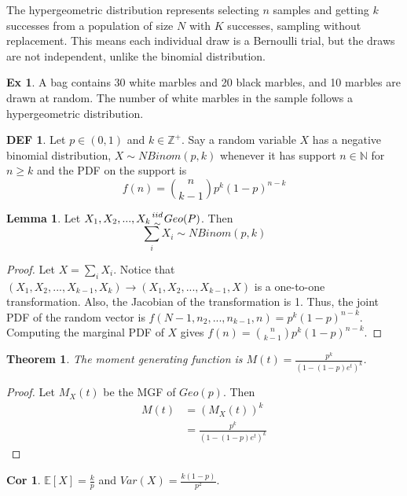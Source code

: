 \documentclass{article}
\newtheorem{theorem}{Theorem}
\theoremstyle{definition}\newtheorem{definition}{DEF}
\theoremstyle{definition}\newtheorem{example}{Ex}
\theoremstyle{lemma}\newtheorem{lemma}{Lemma}
\theoremstyle{corrolary}\newtheorem{corrolary}{Cor}
\begin{document}
The hypergeometric distribution represents selecting $n$ samples and getting $k$ successes from a population of size $N$ with $K$ successes, sampling without replacement.
This means each individual draw is a Bernoulli trial, but the draws are not independent, unlike the binomial distribution.\\

\begin{example}
A bag contains 30 white marbles and 20 black marbles, and 10 marbles are drawn at random.
The number of white marbles in the sample follows a hypergeometric distribution.
\end{example}

\begin{definition}
Let $p\in(0,1)$ and $k\in\mathbb{Z}^+$.
Say a random variable $X$ has a negative binomial distribution, $X\sim NBinom(p,k)$ whenever it has support $n\in \mathbb{N}$ for $n\geq k$ and the PDF on the support is 
\begin{equation}
f(n)=\binom{n}{k-1}p^k(1-p)^{n-k}
\end{equation}
\end{definition}

\begin{lemma}
Let $X_1, X_2, ..., X_k {iid \atop \sim} Geo(P)$.
Then
\begin{equation}
\sum_i X_i \sim NBinom(p,k)
\end{equation}
\end{lemma}
\begin{proof}
Let $X=\sum_i X_i$.
Notice that $(X_1, X_2, ..., X_{k-1}, X_k) \rightarrow (X_1, X_2, ..., X_{k-1}, X)$ is a one-to-one transformation.
Also, the Jacobian of the transformation is 1.
Thus, the joint PDF of the random vector is $f(N-1, n_2, ..., n_{k-1}, n)=p^k(1-p)^{n-k}$.
Computing the marginal PDF of $X$ gives $f(n)=\binom{n}{k-1}p^k(1-p)^{n-k}$.
\end{proof}

\begin{theorem}
The moment generating function is $M(t)=\frac{p^k}{\left(1-(1-p)e^t\right)^k}$.
\end{theorem}
\begin{proof}
Let $M_X(t)$ be the MGF of $Geo(p)$.
Then
\begin{align*}
M(t)&=(M_X(t))^k\\
&=\frac{p^k}{\left(1-(1-p)e^t\right)^k}
\end{align*}
\end{proof}
\begin{corrolary}
$\mathbb{E}[X]=\frac{k}{p}$ and $Var(X)=\frac{k(1-p)}{p^2}$.
\end{corrolary}
\end{document}
